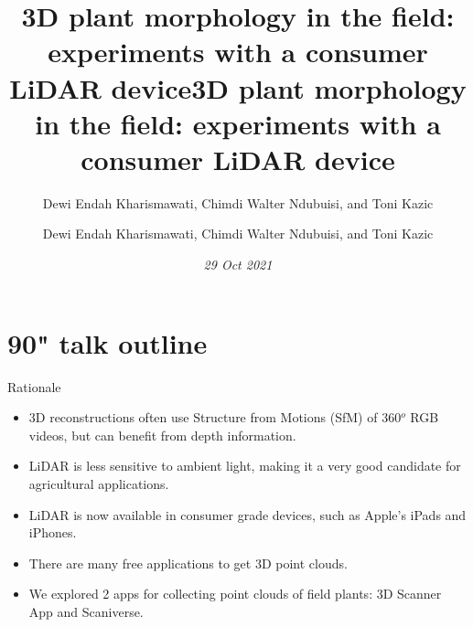 \documentclass[bigger]{beamer}
\author{Dewi Endah Kharismawati, Chimdi Walter Ndubuisi, and Toni Kazic}
\date{\textit{29 Oct 2021}}
\title{3D plant morphology in the field: experiments with a consumer LiDAR device}
\title[3D Field Plants with LiDAR]{3D plant morphology in the field: experiments with a consumer LiDAR device}
\author[Kharismawati \emph{et al.}]{Dewi Endah Kharismawati, Chimdi Walter Ndubuisi, and Toni Kazic}
\institute{University of Missouri}
\def\tdsapp{3D Scanner App\xspace}
\begin{document}
\maketitle
\section{90" talk outline}
\label{sec:org280a454}







\begin{frame}[label={sec:org42af857}]{Rationale}
\begin{itemize}
\item 3D reconstructions often use Structure from Motions (SfM) of 360\(^o\)
RGB videos, but can benefit from depth information.
\item LiDAR is less sensitive to ambient light, making it a
very good candidate for agricultural applications.
\item LiDAR is now available in consumer grade devices, such as
Apple's iPads and iPhones.
\item There are many free applications to get 3D point clouds.
\item We explored 2 apps for collecting point clouds of field plants:
\tdsapp and Scaniverse.
\end{itemize}
\end{frame}
\end{document}
